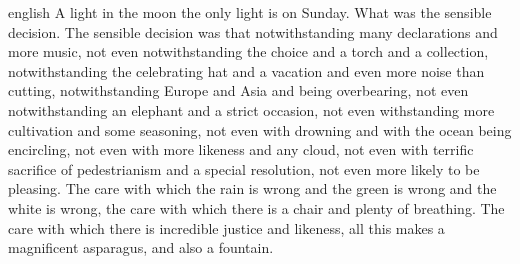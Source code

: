 \begin{otherlanguage*}{english}
A light in the moon the only light is on Sunday. What was the sensible decision. The sensible decision was that notwithstanding many declarations and more music, not even notwithstanding the choice and a torch and a collection, notwithstanding the celebrating hat and a vacation and even more noise than cutting, notwithstanding Europe and Asia and being overbearing, not even notwithstanding an elephant and a strict occasion, not even withstanding more cultivation and some seasoning, not even with drowning and with the ocean being encircling, not even with more likeness and any cloud, not even with terrific sacrifice of pedestrianism and a special resolution, not even more likely to be pleasing. The care with which the rain is wrong and the green is wrong and the white is wrong, the care with which there is a chair and plenty of breathing. The care with which there is incredible justice and likeness, all this makes a magnificent asparagus, and also a fountain.

\end{otherlanguage*}


